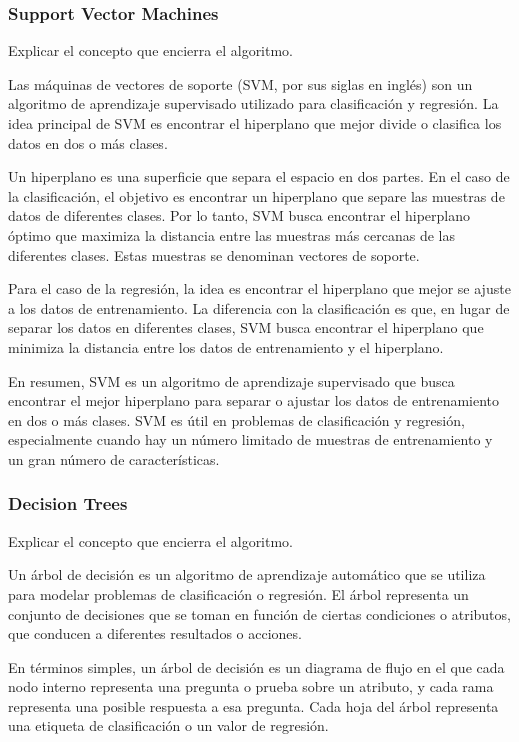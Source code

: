 \documentclass[12pt]{article}
\begin{document}
\subsubsection*{Support Vector Machines}

Explicar el concepto que encierra el algoritmo.

Las máquinas de vectores de soporte (SVM, por sus siglas en inglés) son un algoritmo de aprendizaje supervisado
utilizado para clasificación y regresión. La idea principal de SVM es encontrar el hiperplano que mejor
divide o clasifica los datos en dos o más clases.

Un hiperplano es una superficie que separa el espacio en dos partes. En el caso de la clasificación, el objetivo
es encontrar un hiperplano que separe las muestras de datos de diferentes clases. Por lo tanto, SVM busca encontrar
el hiperplano óptimo que maximiza la distancia entre las muestras más cercanas de las diferentes clases.
Estas muestras se denominan vectores de soporte.

Para el caso de la regresión, la idea es encontrar el hiperplano que mejor se ajuste a los datos de entrenamiento.
La diferencia con la clasificación es que, en lugar de separar los datos en diferentes clases, SVM busca encontrar
el hiperplano que minimiza la distancia entre los datos de entrenamiento y el hiperplano.

En resumen, SVM es un algoritmo de aprendizaje supervisado que busca encontrar el mejor hiperplano para separar
o ajustar los datos de entrenamiento en dos o más clases. SVM es útil en problemas de clasificación y regresión,
especialmente cuando hay un número limitado de muestras de entrenamiento y un gran número de características.

\subsubsection*{Decision Trees}

Explicar el concepto que encierra el algoritmo.

Un árbol de decisión es un algoritmo de aprendizaje automático que se utiliza para modelar problemas de clasificación
o regresión. El árbol representa un conjunto de decisiones que se toman en función de ciertas condiciones
o atributos, que conducen a diferentes resultados o acciones.

En términos simples, un árbol de decisión es un diagrama de flujo en el que cada nodo interno representa una pregunta
o prueba sobre un atributo, y cada rama representa una posible respuesta a esa pregunta. 
Cada hoja del árbol representa una etiqueta de clasificación o un valor de regresión.
\end{document}
